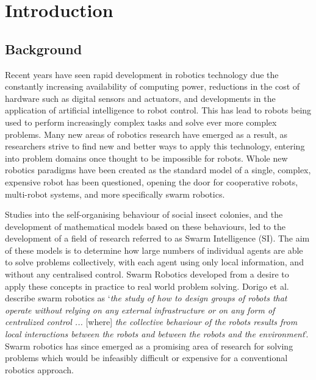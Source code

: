 
\chapter[Introduction]{Introduction} %

\label{Chapter1} %


\newcommand{\keyword}[1]{\textbf{#1}}
\newcommand{\tabhead}[1]{\textbf{#1}}
\newcommand{\code}[1]{\texttt{#1}}
\newcommand{\file}[1]{\texttt{\bfseries#1}}
\newcommand{\option}[1]{\texttt{\itshape#1}}


\section{Background}
Recent years have seen rapid development in robotics technology due the constantly increasing availability of computing power, reductions in the cost of hardware such as digital sensors and actuators, and developments in the application of artificial intelligence to robot control. This has lead to robots being used to perform increasingly complex tasks and solve ever more complex problems. Many new areas of robotics research have emerged as a result, as researchers strive to find new and better ways to apply this technology, entering into problem domains once thought to be impossible for robots. Whole new robotics paradigms have been created as the standard model of a single, complex, expensive robot has been questioned, opening the door for cooperative robots, multi-robot systems, and more specifically swarm robotics.

Studies into the self-organising behaviour of social insect colonies, and the development of mathematical models based on these behaviours, led to the development of a field of research referred to as Swarm Intelligence (SI). The aim of these models is to determine how large numbers of individual agents are able to solve problems collectively, with each agent using only local information, and without any centralised control. Swarm Robotics developed from a desire to apply these concepts in practice to real world problem solving. Dorigo et al. describe swarm robotics as `\textit{the study of how to design groups of robots that operate without relying on any external infrastructure or on any form of centralized control ... }[where]\textit{ the collective behaviour of the robots results from local interactions between the robots and between the robots and the environment}\cite{Dorigo:2014}'. Swarm robotics has since emerged as a promising area of research for solving problems which would be infeasibly difficult or expensive for a conventional robotics approach.

